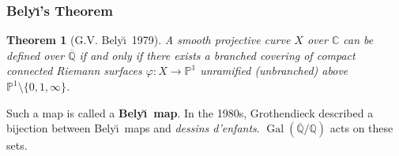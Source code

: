 \documentclass[xcolor=dvipsnames]{beamer}
\DeclareMathOperator{\Gal}{Gal}
\theoremstyle{plain}
\newtheorem*{thm}{Theorem}
\newcommand{\C}{\mathbb C}
\newcommand{\PP}{\mathbb P}
\newcommand{\Q}{\mathbb Q}
\newcommand{\Belyi}{Bely\u{\i}}
\begin{document}
  \begin{frame}[plain]
    \frametitle{\Belyi's Theorem}
    \pause
    \begin{thm}[G.V. \Belyi\ 1979]
      A smooth projective curve $X$ over $\C$
      can be defined over $\overline{\Q}$ if and only if there
      exists a branched covering of compact connected Riemann surfaces $\varphi:X\to\PP^1$
      unramified (unbranched) above $\PP^1\setminus\{0,1,\infty\}$.
    \end{thm}
    \pause
    Such a map is called a \textbf{\Belyi\ map}.
    \pause
    \newline
    \newline
    In the 1980s,
    Grothendieck described a bijection
    between \Belyi\ maps and \emph{dessins d'enfants}.
    \pause
    $\Gal(\overline{\Q}/\Q)$ acts on these sets.
  \end{frame}
\end{document}
